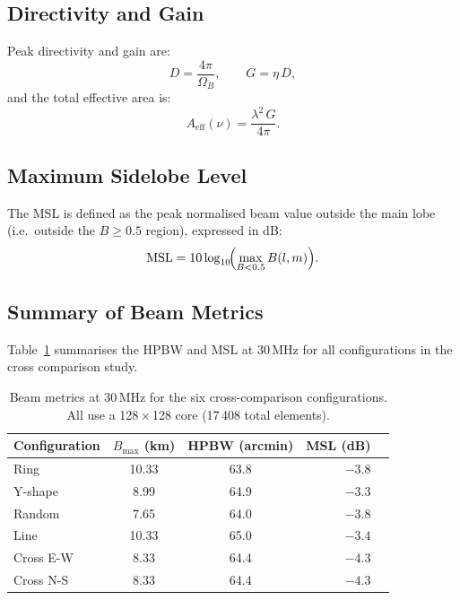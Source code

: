 \documentclass[12pt,a4paper]{article}
\begin{document}
\subsection{Directivity and Gain}

Peak directivity and gain are:
\begin{equation}
  D = \frac{4\pi}{\Omega_B}, \qquad G = \eta\,D,
\end{equation}
and the total effective area is:
\begin{equation}
  A_\mathrm{eff}(\nu) = \frac{\lambda^2\,G}{4\pi}.
\end{equation}

\subsection{Maximum Sidelobe Level}

The MSL is defined as the peak normalised beam value outside the main lobe
(i.e.\ outside the $B \ge 0.5$ region), expressed in dB:
\begin{equation}
  \mathrm{MSL} = 10\log_{10}\!\Bigl(\max_{B < 0.5} B(l,m)\Bigr).
\end{equation}

\subsection{Summary of Beam Metrics}

Table~\ref{tab:beam_metrics} summarises the HPBW and MSL at 30\,MHz for all
configurations in the cross comparison study.

\begin{table}[H]
  \centering
  \caption{Beam metrics at 30\,MHz for the six cross-comparison configurations.
    All use a 128\,$\times$\,128 core (17\,408 total elements).}
  \label{tab:beam_metrics}
  \begin{tabular}{lccrr}
    \toprule
    Configuration & $B_\mathrm{max}$ (km) & HPBW (arcmin) & MSL (dB) \\
    \midrule
    Ring             & 10.33 & 63.8 & $-3.8$ \\
    Y-shape          &  8.99 & 64.9 & $-3.3$ \\
    Random           &  7.65 & 64.0 & $-3.8$ \\
    Line             & 10.33 & 65.0 & $-3.4$ \\
    Cross E-W        &  8.33 & 64.4 & $-4.3$ \\
    Cross N-S        &  8.33 & 64.4 & $-4.3$ \\
    \bottomrule
  \end{tabular}
\end{table}
\end{document}
